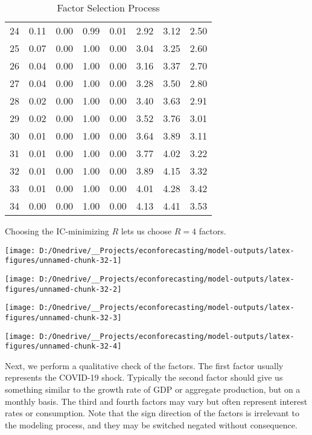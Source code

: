 \documentclass[11pt, letterpaper]{article}\usepackage[]{graphicx}\usepackage[]{color}
\begin{document}
\begin{table}[H]
\begin{tabular}{cccccccc}
   24 & 0.11 & 0.00 & 0.99 & 0.01 & 2.92 & 3.12 & 2.50 \\ 
   25 & 0.07 & 0.00 & 1.00 & 0.00 & 3.04 & 3.25 & 2.60 \\ 
   26 & 0.04 & 0.00 & 1.00 & 0.00 & 3.16 & 3.37 & 2.70 \\ 
   27 & 0.04 & 0.00 & 1.00 & 0.00 & 3.28 & 3.50 & 2.80 \\ 
   28 & 0.02 & 0.00 & 1.00 & 0.00 & 3.40 & 3.63 & 2.91 \\ 
   29 & 0.02 & 0.00 & 1.00 & 0.00 & 3.52 & 3.76 & 3.01 \\ 
   30 & 0.01 & 0.00 & 1.00 & 0.00 & 3.64 & 3.89 & 3.11 \\ 
   31 & 0.01 & 0.00 & 1.00 & 0.00 & 3.77 & 4.02 & 3.22 \\ 
   32 & 0.01 & 0.00 & 1.00 & 0.00 & 3.89 & 4.15 & 3.32 \\ 
   33 & 0.01 & 0.00 & 1.00 & 0.00 & 4.01 & 4.28 & 3.42 \\ 
   34 & 0.00 & 0.00 & 1.00 & 0.00 & 4.13 & 4.41 & 3.53 \\ 
   \hline
\end{tabular}
\endgroup
\caption{Factor Selection Process} 
\end{table}


Choosing the IC-minimizing $R$ lets us choose $R = 4$ factors.



{\centering \texttt{[image: D:/Onedrive/\_\_Projects/econforecasting/model-outputs/latex-figures/unnamed-chunk-32-1]} 

}




{\centering \texttt{[image: D:/Onedrive/\_\_Projects/econforecasting/model-outputs/latex-figures/unnamed-chunk-32-2]} 

}




{\centering \texttt{[image: D:/Onedrive/\_\_Projects/econforecasting/model-outputs/latex-figures/unnamed-chunk-32-3]} 

}




{\centering \texttt{[image: D:/Onedrive/\_\_Projects/econforecasting/model-outputs/latex-figures/unnamed-chunk-32-4]} 

}




Next, we perform a qualitative check of the factors. The first factor usually represents the COVID-19 shock. Typically the second factor should give us something similar to the growth rate of GDP or aggregate production, but on a monthly basis. The third and fourth factors may vary but often represent interest rates or consumption. Note that the sign direction of the factors is irrelevant to the modeling process, and they may be switched negated without consequence. 
\end{document}
